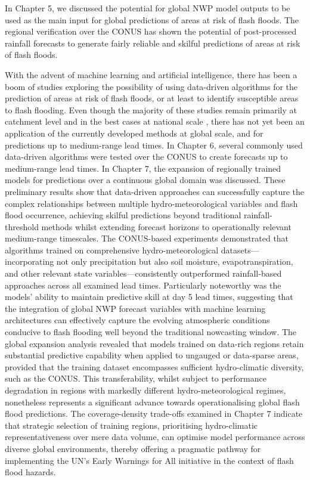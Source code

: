 In Chapter 5, we discussed the potential for global NWP model outputs to be used as the main input for global predictions of areas at risk of flash floods. The regional verification over the CONUS has shown the potential of post-processed rainfall forecasts to generate fairly reliable and skilful predictions of areas at risk of flash floods. 

With the advent of machine learning and artificial intelligence, there has been a boom of studies exploring the possibility of using data-driven algorithms for the prediction of areas at risk of flash floods, or at least to identify susceptible areas to flash flooding. Even though the majority of these studies remain primarily at catchment level and in the best cases at national scale \citep{Liu_2018}, there has not yet been an application of the currently developed methods at global scale, and for predictions up to medium-range lead times. In Chapter 6, several commonly used data-driven algorithms were tested over the CONUS to create forecasts up to medium-range lead times. In Chapter 7, the expansion of regionally trained models for predictions over a continuous global domain was discussed. These preliminary results show that data-driven approaches can successfully capture the complex relationships between multiple hydro-meteorological variables and flash flood occurrence, achieving skilful predictions beyond traditional rainfall-threshold methods whilst extending forecast horizons to operationally relevant medium-range timescales. The CONUS-based experiments demonstrated that algorithms trained on comprehensive hydro-meteorological datasets—incorporating not only precipitation but also soil moisture, evapotranspiration, and other relevant state variables—consistently outperformed rainfall-based approaches across all examined lead times. Particularly noteworthy was the models' ability to maintain predictive skill at day 5 lead times, suggesting that the integration of global NWP forecast variables with machine learning architectures can effectively capture the evolving atmospheric conditions conducive to flash flooding well beyond the traditional nowcasting window. The global expansion analysis revealed that models trained on data-rich regions retain substantial predictive capability when applied to ungauged or data-sparse areas, provided that the training dataset encompasses sufficient hydro-climatic diversity, such as the CONUS. This transferability, whilst subject to performance degradation in regions with markedly different hydro-meteorological regimes, nonetheless represents a significant advance towards operationalising global flash flood predictions. The coverage-density trade-offs examined in Chapter 7 indicate that strategic selection of training regions, prioritising hydro-climatic representativeness over mere data volume, can optimise model performance across diverse global environments, thereby offering a pragmatic pathway for implementing the UN's Early Warnings for All initiative in the context of flash flood hazards.


